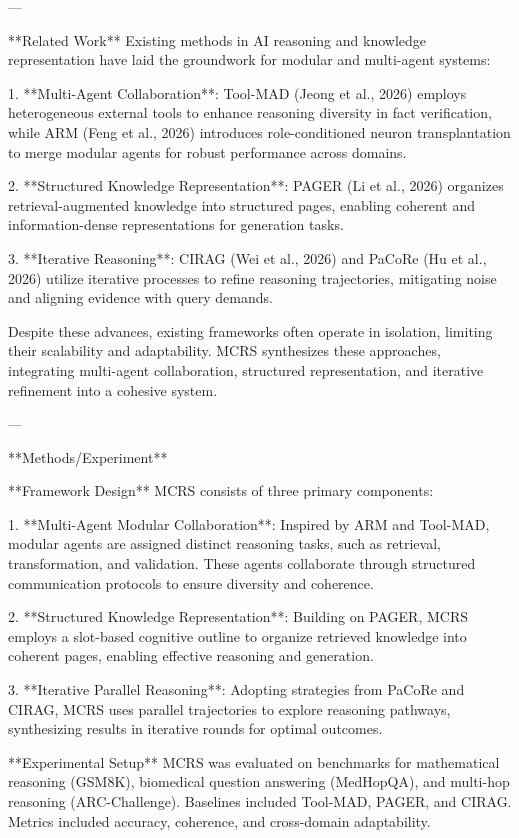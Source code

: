 ---

**Related Work**  
Existing methods in AI reasoning and knowledge representation have laid the groundwork for modular and multi-agent systems:

1. **Multi-Agent Collaboration**: Tool-MAD (Jeong et al., 2026) employs heterogeneous external tools to enhance reasoning diversity in fact verification, while ARM (Feng et al., 2026) introduces role-conditioned neuron transplantation to merge modular agents for robust performance across domains.
   
2. **Structured Knowledge Representation**: PAGER (Li et al., 2026) organizes retrieval-augmented knowledge into structured pages, enabling coherent and information-dense representations for generation tasks.

3. **Iterative Reasoning**: CIRAG (Wei et al., 2026) and PaCoRe (Hu et al., 2026) utilize iterative processes to refine reasoning trajectories, mitigating noise and aligning evidence with query demands.

Despite these advances, existing frameworks often operate in isolation, limiting their scalability and adaptability. MCRS synthesizes these approaches, integrating multi-agent collaboration, structured representation, and iterative refinement into a cohesive system.

---

**Methods/Experiment**  

**Framework Design**  
MCRS consists of three primary components:

1. **Multi-Agent Modular Collaboration**: Inspired by ARM and Tool-MAD, modular agents are assigned distinct reasoning tasks, such as retrieval, transformation, and validation. These agents collaborate through structured communication protocols to ensure diversity and coherence.

2. **Structured Knowledge Representation**: Building on PAGER, MCRS employs a slot-based cognitive outline to organize retrieved knowledge into coherent pages, enabling effective reasoning and generation.

3. **Iterative Parallel Reasoning**: Adopting strategies from PaCoRe and CIRAG, MCRS uses parallel trajectories to explore reasoning pathways, synthesizing results in iterative rounds for optimal outcomes.

**Experimental Setup**  
MCRS was evaluated on benchmarks for mathematical reasoning (GSM8K), biomedical question answering (MedHopQA), and multi-hop reasoning (ARC-Challenge). Baselines included Tool-MAD, PAGER, and CIRAG. Metrics included accuracy, coherence, and cross-domain adaptability.

